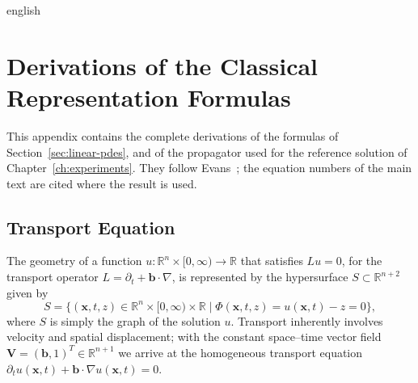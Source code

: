 \documentclass[12pt,letterpaper,twoside]{book}
\begin{document}
\begin{hyphenrules}{english}

\chapter{Derivations of the Classical Representation Formulas}\label{app:classical}

This appendix contains the complete derivations of the formulas of Section~\ref{sec:linear-pdes}, and of
the propagator used for the reference solution of Chapter~\ref{ch:experiments}. They follow
Evans~\cite{evans2010}; the equation numbers of the main text are cited where the result is used.

\section{Transport Equation}\label{app-sec:transport}

The geometry of a function $u:\mathbb{R}^n\times[0,\infty)\to\mathbb{R}$ that satisfies $Lu=0$, for the transport
operator $L=\partial_t+\mathbf{b}\cdot\nabla$, is represented by the hypersurface $S\subset\mathbb{R}^{n+2}$ given by
\begin{equation}
  S=\{(\mathbf{x},t,z)\in\mathbb{R}^n\times[0,\infty)\times\mathbb{R} \mid \Phi(\mathbf{x},t,z)=u(\mathbf{x},t)-z=0\},
  \label{eq:transport-graph}
\end{equation}
where $S$ is simply the graph of the solution $u$. Transport inherently involves velocity and spatial
displacement; with the constant space--time vector field $\mathbf{V}=(\mathbf{b},1)^{T}\in\mathbb{R}^{n+1}$ we arrive at
the homogeneous transport equation $\partial_t u(\mathbf{x},t)+\mathbf{b}\cdot\nabla u(\mathbf{x},t)=0$.


\end{hyphenrules}
\end{document}
